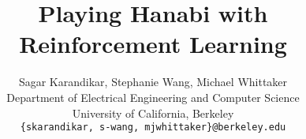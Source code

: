 \documentclass{article}
\title{Playing Hanabi with Reinforcement Learning}
\author{%
  Sagar Karandikar, Stephanie Wang, Michael Whittaker \\
  Department of Electrical Engineering and Computer Science \\
  University of California, Berkeley \\
  \texttt{\{skarandikar, s-wang, mjwhittaker\}@berkeley.edu} \\
}
\begin{document}
\maketitle

{}
{}
{}
{}
{}
{}
{}



\end{document}
